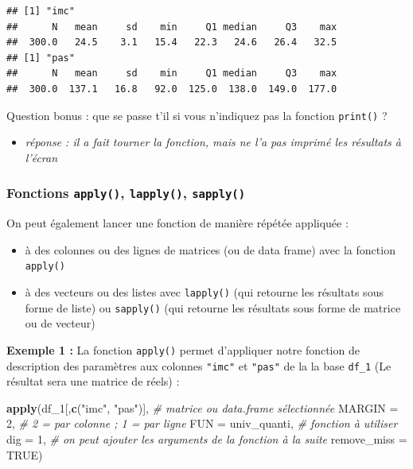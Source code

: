 \documentclass[
]{book}
\newenvironment{Shaded}{\begin{snugshade}}{\end{snugshade}}
\newcommand{\AttributeTok}[1]{\textcolor[rgb]{0.13,0.29,0.53}{#1}}
\newcommand{\CommentTok}[1]{\textcolor[rgb]{0.56,0.35,0.01}{\textit{#1}}}
\newcommand{\ConstantTok}[1]{\textcolor[rgb]{0.56,0.35,0.01}{#1}}
\newcommand{\DecValTok}[1]{\textcolor[rgb]{0.00,0.00,0.81}{#1}}
\newcommand{\FunctionTok}[1]{\textcolor[rgb]{0.13,0.29,0.53}{\textbf{#1}}}
\newcommand{\NormalTok}[1]{#1}
\newcommand{\StringTok}[1]{\textcolor[rgb]{0.31,0.60,0.02}{#1}}
\providecommand{\tightlist}{%
  \setlength{\itemsep}{0pt}\setlength{\parskip}{0pt}}
\begin{document}
\begin{verbatim}
## [1] "imc"
##      N   mean     sd    min     Q1 median     Q3    max 
##  300.0   24.5    3.1   15.4   22.3   24.6   26.4   32.5 
## [1] "pas"
##      N   mean     sd    min     Q1 median     Q3    max 
##  300.0  137.1   16.8   92.0  125.0  138.0  149.0  177.0
\end{verbatim}

Question bonus : que se passe t'il si vous n'indiquez pas la fonction \texttt{print()} ?

\begin{itemize}
\tightlist
\item
  \emph{réponse : il a fait tourner la fonction, mais ne l'a pas imprimé les résultats à l'écran}
\end{itemize}

\subsubsection{\texorpdfstring{Fonctions \texttt{apply()}, \texttt{lapply()}, \texttt{sapply()}}{Fonctions apply(), lapply(), sapply()}}\label{fonctions-apply-lapply-sapply}

On peut également lancer une fonction de manière répétée appliquée :

\begin{itemize}
\tightlist
\item
  à des colonnes ou des lignes de matrices (ou de data frame) avec la fonction \texttt{apply()}
\item
  à des vecteurs ou des listes avec \texttt{lapply()} (qui retourne les résultats sous forme de liste) ou \texttt{sapply()} (qui retourne les résultats sous forme de matrice ou de vecteur)
\end{itemize}

\textbf{Exemple 1 :} La fonction \texttt{apply()} permet d'appliquer notre fonction de description des paramètres aux colonnes \texttt{"imc"} et \texttt{"pas"} de la la base \texttt{df\_1} (Le résultat sera une matrice de réels) :

\begin{Shaded}
\begin{Highlighting}[]
\FunctionTok{apply}\NormalTok{(df\_1[,}\FunctionTok{c}\NormalTok{(}\StringTok{"imc"}\NormalTok{, }\StringTok{"pas"}\NormalTok{)], }\CommentTok{\# matrice ou data.frame sélectionnée}
      \AttributeTok{MARGIN =} \DecValTok{2}\NormalTok{, }\CommentTok{\# 2 = par colonne ;  1 = par ligne}
      \AttributeTok{FUN =}\NormalTok{ univ\_quanti, }\CommentTok{\# fonction à utiliser}
      \AttributeTok{dig =} \DecValTok{1}\NormalTok{, }\CommentTok{\# on peut ajouter les arguments de la fonction à la suite}
      \AttributeTok{remove\_miss =} \ConstantTok{TRUE}\NormalTok{) }
\end{Highlighting}
\end{Shaded}
\end{document}
